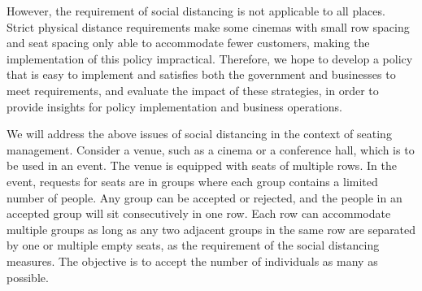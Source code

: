 % 

However, the requirement of social distancing is not applicable to all places. Strict physical distance requirements make some cinemas with small row spacing and seat spacing only able to accommodate fewer customers, making the implementation of this policy impractical. Therefore, we hope to develop a policy that is easy to implement and satisfies both the government and businesses to meet requirements, and evaluate the impact of these strategies, in order to provide insights for policy implementation and business operations.




We will address the above issues of social distancing in the context of seating management. Consider  a venue, such as a cinema or a conference hall, which is to be used in an event. The venue is equipped with seats of multiple rows. In the event, requests for seats are in groups where each group contains a limited number of people. Any group can be accepted or rejected, and the people in an accepted group  will sit consecutively in one row. Each row can accommodate multiple groups as long as any two adjacent groups in the same row are separated by one or multiple empty seats, as the requirement of the social distancing measures. The objective is to accept the number of individuals as many as possible.

